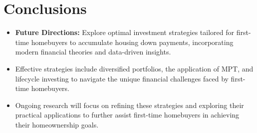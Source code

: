 \section{Conclusions}
\begin{itemize}
    \item \textbf{Future Directions:} Explore optimal investment strategies tailored for first-time homebuyers to accumulate housing down payments, incorporating modern financial theories and data-driven insights.
    \item Effective strategies include diversified portfolios, the application of MPT, and lifecycle investing to navigate the unique financial challenges faced by first-time homebuyers.
    \item Ongoing research will focus on refining these strategies and exploring their practical applications to further assist first-time homebuyers in achieving their homeownership goals.
\end{itemize}

